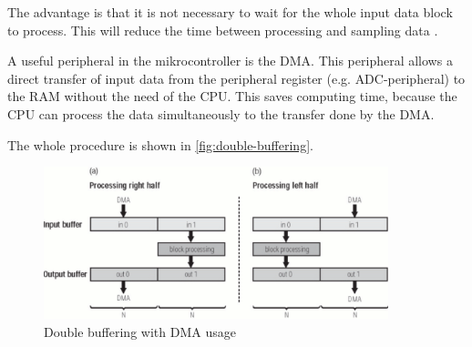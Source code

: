 The advantage is that it is not necessary to wait for the whole input data block to process.
This will reduce the time between processing and sampling data \cite{eetimes_fund_dsp}.

A useful peripheral in the mikrocontroller is the \ac{DMA}. This peripheral allows a
direct transfer of input data from the peripheral register (e.g. \ac{ADC}-peripheral) to the \ac{RAM} 
without the need of the \ac{CPU}. This saves computing time, because the \ac{CPU} can process
the data simultaneously to the transfer done by the \ac{DMA}.

The whole procedure is shown in \autoref{fig:double-buffering}.

\begin{figure}[!h]
    \centering
    \includegraphics[width=10cm]{img/double_buffering_dma.PNG}
    \caption{Double buffering with DMA usage \cite{eetimes_fund_dsp}}
    \label{fig:double-buffering}
\end{figure}
